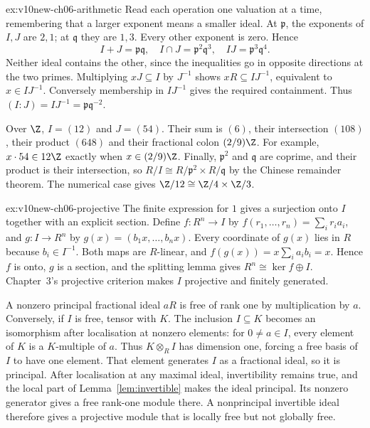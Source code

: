 \begin{solution}{ex:v10new-ch06-arithmetic}
\idea Read each operation one valuation at a time, remembering that a larger exponent means a smaller ideal.
\writeup At $\mathfrak p$, the exponents of $I,J$ are $2,1$; at $\mathfrak q$ they are $1,3$. Every other exponent is zero. Hence
\[
 I+J=\mathfrak p\mathfrak q,\quad
 I\cap J=\mathfrak p^2\mathfrak q^3,\quad
 IJ=\mathfrak p^3\mathfrak q^4.
\]
Neither ideal contains the other, since the inequalities go in opposite directions at the two primes. Multiplying $xJ\subseteq I$ by $J^{-1}$ shows $xR\subseteq IJ^{-1}$, equivalent to $x\in IJ^{-1}$. Conversely membership in $IJ^{-1}$ gives the required containment. Thus $(I:J)=IJ^{-1}=\mathfrak p\mathfrak q^{-2}$.

Over $\Z$, $I=(12)$ and $J=(54)$. Their sum is $(6)$, their intersection $(108)$, their product $(648)$ and their fractional colon $(2/9)\Z$. For example, $x\cdot54\in12\Z$ exactly when $x\in(2/9)\Z$. Finally, $\mathfrak p^2$ and $\mathfrak q$ are coprime, and their product is their intersection, so
$R/I\cong R/\mathfrak p^2\times R/\mathfrak q$ by the Chinese remainder theorem. The numerical case gives $\Z/12\cong\Z/4\times\Z/3$.
\end{solution}

\begin{solution}{ex:v10new-ch06-projective}
\idea The finite expression for $1$ gives a surjection onto $I$ together with an explicit section.
\writeup Define $f\colon R^n\to I$ by $f(r_1,\ldots,r_n)=\sum_i r_i a_i$, and $g\colon I\to R^n$ by $g(x)=(b_1x,\ldots,b_nx)$. Every coordinate of $g(x)$ lies in $R$ because $b_i\in I^{-1}$. Both maps are $R$-linear, and $f(g(x))=x\sum_i a_ib_i=x$. Hence $f$ is onto, $g$ is a section, and the splitting lemma gives $R^n\cong\ker f\oplus I$. Chapter~3's projective criterion makes $I$ projective and finitely generated.

A nonzero principal fractional ideal $aR$ is free of rank one by multiplication by $a$. Conversely, if $I$ is free, tensor with $K$. The inclusion $I\subseteq K$ becomes an isomorphism after localisation at nonzero elements: for $0\ne a\in I$, every element of $K$ is a $K$-multiple of $a$. Thus $K\otimes_R I$ has dimension one, forcing a free basis of $I$ to have one element. That element generates $I$ as a fractional ideal, so it is principal. After localisation at any maximal ideal, invertibility remains true, and the local part of Lemma~\ref{lem:invertible} makes the ideal principal. Its nonzero generator gives a free rank-one module there. A nonprincipal invertible ideal therefore gives a projective module that is locally free but not globally free.
\end{solution}

